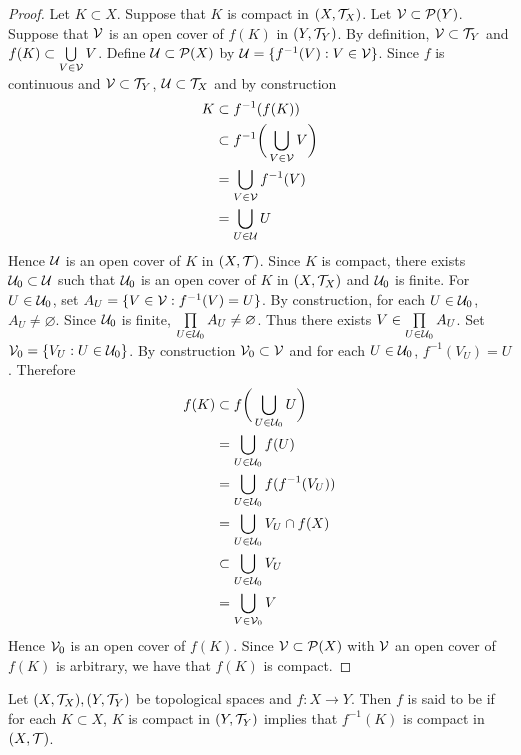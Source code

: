 \documentclass{book}
\begin{document}
\begin{proof}
	Let $K \subset X$. Suppose that $K$ is compact in $(X, \mathcal{T}_X)$. Let $\mathcal{V} \subset \mathcal{P}(Y)$. Suppose that $\mathcal{V}$ is an open cover of $f(K)$ in $(Y, \mathcal{T}_Y)$. By definition, $\mathcal{V} \subset \mathcal{T}_Y$ and $f(K) \subset \bigcup\limits_{V \in \mathcal{V}} V$. Define $\mathcal{U} \subset \mathcal{P}(X)$ by $\mathcal{U} = \{f^{-1}(V):V \in \mathcal{V}\}$. Since $f$ is continuous and $\mathcal{V} \subset \mathcal{T}_Y$, $\mathcal{U} \subset \mathcal{T}_X$ and by construction
	\begin{align*}
		K
		& \subset f^{-1}(f(K)) \\
		& \subset f^{-1}\bigg( \bigcup\limits_{V \in \mathcal{V}} V \bigg) \\
		& = \bigcup\limits_{V \in \mathcal{V}} f^{-1}(V) \\
		& = \bigcup\limits_{U \in \mathcal{U}} U \\
	\end{align*}
	Hence $\mathcal{U}$ is an open cover of $K$ in $(X, \mathcal{T})$. Since $K$ is compact, there exists $\mathcal{U}_0 \subset \mathcal{U}$ such that $\mathcal{U}_0$ is an open cover of $K$ in $(X, \mathcal{T}_X)$ and $\mathcal{U}_0$ is finite. For $U \in \mathcal{U}_0$, set $A_U = \{V \in \mathcal{V}: f^{-1}(V) = U \}$. By construction, for each $U \in \mathcal{U}_0$, $A_U \neq \varnothing$. Since $\mathcal{U}_0$ is finite, $\prod\limits_{U \in \mathcal{U}_0} A_U \neq \varnothing$. Thus there exists $V \in \prod\limits_{U \in \mathcal{U}_0} A_U$. Set $\mathcal{V}_0 = \{V_U: U \in \mathcal{U}_0\}$. By construction $\mathcal{V}_0 \subset \mathcal{V}$ and for each $U \in \mathcal{U}_0$, $f^{-1}(V_U) = U$. Therefore 
	\begin{align*}
		f(K)
		& \subset f \bigg( \bigcup\limits_{U \in \mathcal{U}_0} U \bigg) \\
		& = \bigcup\limits_{U \in \mathcal{U}_0} f(U) \\
		& = \bigcup\limits_{U \in \mathcal{U}_0} f (f^{-1}(V_U)) \\
		& = \bigcup\limits_{U \in \mathcal{U}_0} V_U \cap f(X) \\
		& \subset \bigcup\limits_{U \in \mathcal{U}_0} V_U \\
		& = \bigcup\limits_{V \in \mathcal{V}_0} V \\
	\end{align*}
	Hence $\mathcal{V}_0$ is an open cover of $f(K)$. Since $\mathcal{V} \subset \mathcal{P}(X)$ with $\mathcal{V}$ an open cover of $f(K)$ is arbitrary, we have that $f(K)$ is compact.
\end{proof}

 
 
 \begin{defn}  
 	Let $(X, \mathcal{T}_X), (Y, \mathcal{T}_Y)$ be topological spaces and $f: X \rightarrow Y$. Then $f$ is said to be  if for each $K \subset X$, $K$ is compact in $(Y, \mathcal{T}_Y)$ implies that $f^{-1}(K)$ is compact in $(X, \mathcal{T})$. 
 \end{defn}
\end{document}
